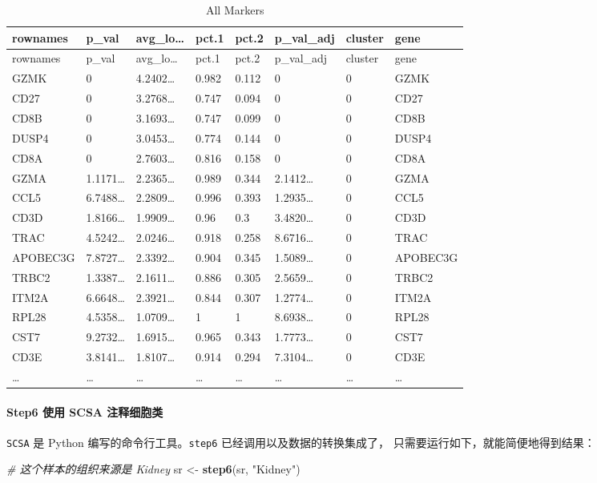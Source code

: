 \documentclass[
]{article}
\newenvironment{Shaded}{\begin{snugshade}}{\end{snugshade}}
\newcommand{\CommentTok}[1]{\textcolor[rgb]{0.56,0.35,0.01}{\textit{#1}}}
\newcommand{\KeywordTok}[1]{\textcolor[rgb]{0.13,0.29,0.53}{\textbf{#1}}}
\newcommand{\NormalTok}[1]{#1}
\newcommand{\StringTok}[1]{\textcolor[rgb]{0.31,0.60,0.02}{#1}}
\begin{document}
\begin{longtable}[]{@{}llllllll@{}}
\caption{\label{tab:All-Markers}All Markers}\tabularnewline
\toprule
rownames & p\_val & avg\_lo\ldots{} & pct.1 & pct.2 & p\_val\_adj & cluster & gene\tabularnewline
\midrule
\endfirsthead
\toprule
rownames & p\_val & avg\_lo\ldots{} & pct.1 & pct.2 & p\_val\_adj & cluster & gene\tabularnewline
\midrule
\endhead
GZMK & 0 & 4.2402\ldots{} & 0.982 & 0.112 & 0 & 0 & GZMK\tabularnewline
CD27 & 0 & 3.2768\ldots{} & 0.747 & 0.094 & 0 & 0 & CD27\tabularnewline
CD8B & 0 & 3.1693\ldots{} & 0.747 & 0.099 & 0 & 0 & CD8B\tabularnewline
DUSP4 & 0 & 3.0453\ldots{} & 0.774 & 0.144 & 0 & 0 & DUSP4\tabularnewline
CD8A & 0 & 2.7603\ldots{} & 0.816 & 0.158 & 0 & 0 & CD8A\tabularnewline
GZMA & 1.1171\ldots{} & 2.2365\ldots{} & 0.989 & 0.344 & 2.1412\ldots{} & 0 & GZMA\tabularnewline
CCL5 & 6.7488\ldots{} & 2.2809\ldots{} & 0.996 & 0.393 & 1.2935\ldots{} & 0 & CCL5\tabularnewline
CD3D & 1.8166\ldots{} & 1.9909\ldots{} & 0.96 & 0.3 & 3.4820\ldots{} & 0 & CD3D\tabularnewline
TRAC & 4.5242\ldots{} & 2.0246\ldots{} & 0.918 & 0.258 & 8.6716\ldots{} & 0 & TRAC\tabularnewline
APOBEC3G & 7.8727\ldots{} & 2.3392\ldots{} & 0.904 & 0.345 & 1.5089\ldots{} & 0 & APOBEC3G\tabularnewline
TRBC2 & 1.3387\ldots{} & 2.1611\ldots{} & 0.886 & 0.305 & 2.5659\ldots{} & 0 & TRBC2\tabularnewline
ITM2A & 6.6648\ldots{} & 2.3921\ldots{} & 0.844 & 0.307 & 1.2774\ldots{} & 0 & ITM2A\tabularnewline
RPL28 & 4.5358\ldots{} & 1.0709\ldots{} & 1 & 1 & 8.6938\ldots{} & 0 & RPL28\tabularnewline
CST7 & 9.2732\ldots{} & 1.6915\ldots{} & 0.965 & 0.343 & 1.7773\ldots{} & 0 & CST7\tabularnewline
CD3E & 3.8141\ldots{} & 1.8107\ldots{} & 0.914 & 0.294 & 7.3104\ldots{} & 0 & CD3E\tabularnewline
\ldots{} & \ldots{} & \ldots{} & \ldots{} & \ldots{} & \ldots{} & \ldots{} & \ldots{}\tabularnewline
\bottomrule
\end{longtable}

\hypertarget{step6-ux4f7fux7528-scsa-ux6ce8ux91caux7ec6ux80deux7c7b}{%
\paragraph{Step6 使用 SCSA 注释细胞类}\label{step6-ux4f7fux7528-scsa-ux6ce8ux91caux7ec6ux80deux7c7b}}

\texttt{SCSA} 是 Python 编写的命令行工具。\texttt{step6} 已经调用以及数据的转换集成了，
只需要运行如下，就能简便地得到结果：

\begin{Shaded}
\begin{Highlighting}[]
\CommentTok{\# 这个样本的组织来源是 Kidney}
\NormalTok{sr \textless{}{-}}\StringTok{ }\KeywordTok{step6}\NormalTok{(sr, }\StringTok{"Kidney"}\NormalTok{)}
\end{Highlighting}
\end{Shaded}
\end{document}
